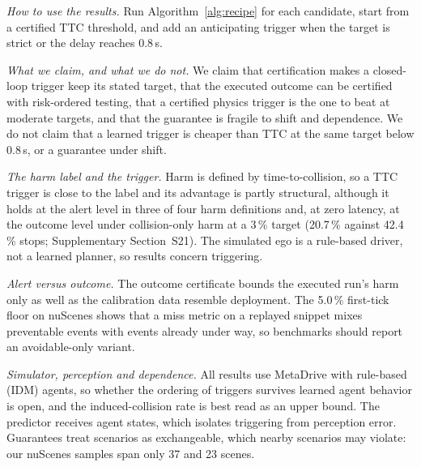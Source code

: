 \documentclass[lettersize,journal]{IEEEtran}
\begin{document}
\emph{How to use the results.} Run Algorithm~\ref{alg:recipe} for each candidate, start from a certified TTC threshold, and add an anticipating trigger when the target is strict or the delay reaches 0.8\,s.

\emph{What we claim, and what we do not.} We claim that certification makes
a closed-loop trigger keep its stated target, that the executed outcome can be
certified with risk-ordered testing, that a certified physics trigger is the one
to beat at moderate targets, and that the guarantee is fragile to shift and
dependence. We do not claim that a learned trigger is cheaper than TTC at the
same target below 0.8\,s, or a guarantee under shift.

\emph{The harm label and the trigger.} Harm is defined by
time-to-collision, so a TTC trigger is close to the label and its advantage is
partly structural, although it holds at the alert level in three of four
harm definitions and, at zero latency, at the outcome level under collision-only
harm at a 3\,\% target (20.7\,\% against 42.4\,\% stops; Supplementary Section~S21). The simulated ego is a rule-based driver, not a
learned planner, so results concern triggering.

\emph{Alert versus outcome.} The outcome certificate bounds the executed run's harm only as well as the calibration data resemble deployment. The 5.0\,\% first-tick floor on nuScenes shows that a miss metric on a replayed snippet mixes preventable events with events already under way, so benchmarks should report an avoidable-only variant.

\emph{Simulator, perception and dependence.} All results use MetaDrive with rule-based (IDM) agents, so whether the ordering of triggers survives learned agent behavior is open, and the induced-collision rate is best read as an upper bound. The predictor receives agent states, which isolates triggering from perception error. Guarantees treat scenarios as exchangeable, which nearby scenarios may violate: our nuScenes samples span only 37 and 23 scenes.

\end{document}
